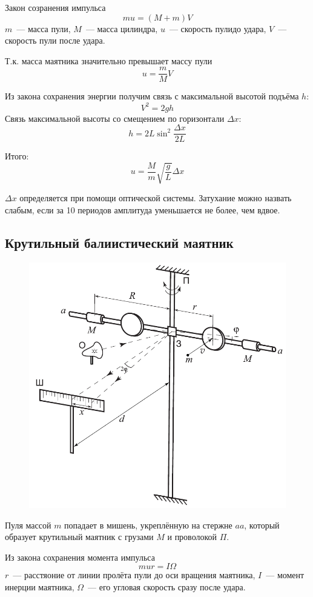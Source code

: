 Закон созранения импульса
\[mu=\left(M+m\right)V\]
$m$~--- масса пули, $M$~--- масса цилиндра, $u$~--- скорость пулидо удара, $V$~---
скорость пули после удара.

Т.к. масса маятника значительно превышает массу пули
\[u=\frac{m}{M}V\]

Из закона сохранения энергии получим связь с максимальной высотой подъёма $h$:
\[V^2=2gh\]
Связь максимальной высоты со смещением по горизонтали $\Delta x$:
\[h=2L\sin^2\frac{\Delta x}{2L}\]

Итого:
\[u=\frac{M}{m}\sqrt{\frac{g}{L}}\Delta x\]

$\Delta x$ определяется при помощи оптической системы. Затухание можно назвать слабым,
если за 10 периодов амплитуда уменьшается не более, чем вдвое.

\subsection{Крутильный балиистический маятник}
\begin{figure}[ht!]
    \centering\includegraphics[width=0.8\linewidth]{img/scheme3.png}
\end{figure}

Пуля массой $m$ попадает в мишень, укреплённую на стержне $aa$, который образует
крутильный маятник с грузами $M$ и проволокой $\Pi$.

Из закона сохранения момента импульса
\[mur = I\Omega\]
$r$~--- расстяоние от линии пролёта пули до оси вращения маятника, $I$~--- момент инерции
маятника, $\Omega$~--- его угловая скорость сразу после удара.

